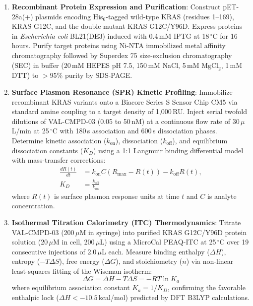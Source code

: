 \documentclass[10pt,journal,compsoc]{IEEEtran}
\begin{document}
\begin{enumerate}
    \item \textbf{Recombinant Protein Expression and Purification}:
    Construct pET-28a(+) plasmids encoding His$_6$-tagged wild-type KRAS (residues 1--169), KRAS G12C, and the double mutant KRAS G12C/Y96D. Express proteins in \textit{Escherichia coli} BL21(DE3) induced with 0.4\,mM IPTG at 18\,$^\circ$C for 16\,hours. Purify target proteins using Ni-NTA immobilized metal affinity chromatography followed by Superdex 75 size-exclusion chromatography (SEC) in buffer (20\,mM HEPES pH 7.5, 150\,mM NaCl, 5\,mM $\text{MgCl}_2$, 1\,mM DTT) to $>95\%$ purity by SDS-PAGE.
    
    \item \textbf{Surface Plasmon Resonance (SPR) Kinetic Profiling}:
    Immobilize recombinant KRAS variants onto a Biacore Series S Sensor Chip CM5 via standard amine coupling to a target density of 1,000\,RU. Inject serial twofold dilutions of VAL-CMPD-03 (0.05 to 50\,nM) at a continuous flow rate of 30\,$\mu$L/min at 25\,$^\circ$C with 180\,s association and 600\,s dissociation phases. Determine kinetic association ($k_{\text{on}}$), dissociation ($k_{\text{off}}$), and equilibrium dissociation constants ($K_D$) using a 1:1 Langmuir binding differential model with mass-transfer corrections:
    \begin{equation}
    \begin{split}
    \frac{dR(t)}{dt} &= k_{\text{on}} C (R_{\max} - R(t)) - k_{\text{off}} R(t), \\
    K_D &= \frac{k_{\text{off}}}{k_{\text{on}}}
    \end{split}
    \label{eq:spr_kinetics}
    \end{equation}
    where $R(t)$ is surface plasmon response units at time $t$ and $C$ is analyte concentration.
    
    \item \textbf{Isothermal Titration Calorimetry (ITC) Thermodynamics}:
    Titrate VAL-CMPD-03 (200\,$\mu$M in syringe) into purified KRAS G12C/Y96D protein solution (20\,$\mu$M in cell, 200\,$\mu$L) using a MicroCal PEAQ-ITC at 25\,$^\circ$C over 19 consecutive injections of 2.0\,$\mu$L each. Measure binding enthalpy ($\Delta H$), entropy ($-T\Delta S$), free energy ($\Delta G$), and stoichiometry ($n$) via non-linear least-squares fitting of the Wiseman isotherm:
    \begin{equation}
    \Delta G = \Delta H - T\Delta S = -RT \ln K_a
    \label{eq:itc_thermo}
    \end{equation}
    where equilibrium association constant $K_a = 1/K_D$, confirming the favorable enthalpic lock ($\Delta H < -10.5$\,kcal/mol) predicted by DFT B3LYP calculations.
    

\end{enumerate}
\end{document}
